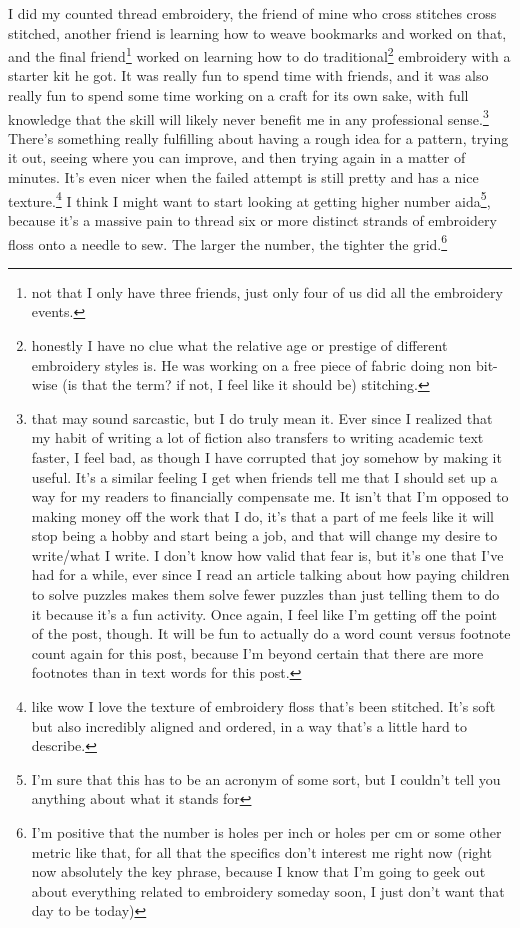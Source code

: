 \documentclass[12pt]{article}[titlepage]
\newcommand{\1}{\={a}}
\newcommand{\2}{\={e}}
\newcommand{\3}{\={\i}}
\newcommand{\4}{\=o}
\newcommand{\5}{\=u}
\newcommand{\6}{\={A}}
\renewcommand{\,}{\textsuperscript{,}}
\begin{document}
I did my counted thread embroidery, the friend of mine who cross stitches cross stitched, another friend is learning how to weave bookmarks and worked on that, and the final friend\footnote{not that I only have three friends, just only four of us did all the embroidery events.} worked on learning how to do traditional\footnote{honestly I have no clue what the relative age or prestige of different embroidery styles is. He was working on a free piece of fabric doing non bit-wise (is that the term? if not, I feel like it should be) stitching.} embroidery with a starter kit he got.
It was really fun to spend time with friends, and it was also really fun to spend some time working on a craft for its own sake, with full knowledge that the skill will likely never benefit me in any professional sense.\footnote{that may sound sarcastic, but I do truly mean it.
Ever since I realized that my habit of writing a lot of fiction also transfers to writing academic text faster, I feel bad, as though I have corrupted that joy somehow by making it useful.
It's a similar feeling I get when friends tell me that I should set up a way for my readers to financially compensate me.
It isn't that I'm opposed to making money off the work that I do, it's that a part of me feels like it will stop being a hobby and start being a job, and that will change my desire to write/what I write.
I don't know how valid that fear is, but it's one that I've had for a while, ever since I read an article talking about how paying children to solve puzzles makes them solve fewer puzzles than just telling them to do it because it's a fun activity.
Once again, I feel like I'm getting off the point of the post, though.
It will be fun to actually do a word count versus footnote count again for this post, because I'm beyond certain that there are more footnotes than in text words for this post.}
There's something really fulfilling about having a rough idea for a pattern, trying it out, seeing where you can improve, and then trying again in a matter of minutes.
It's even nicer when the failed attempt is still pretty and has a nice texture.\footnote{like wow I love the texture of embroidery floss that's been stitched.
It's soft but also incredibly aligned and ordered, in a way that's a little hard to describe.}
I think I might want to start looking at getting higher number aida\footnote{I'm sure that this has to be an acronym of some sort, but I couldn't tell you anything about what it stands for}, because it's a massive pain to thread six or more distinct strands of embroidery floss onto a needle to sew.
The larger the number, the tighter the grid.\footnote{I'm positive that the number is holes per inch or holes per cm or some other metric like that, for all that the specifics don't interest me right now (right now absolutely the key phrase, because I know that I'm going to geek out about everything related to embroidery someday soon, I just don't want that day to be today)}
\end{document}
